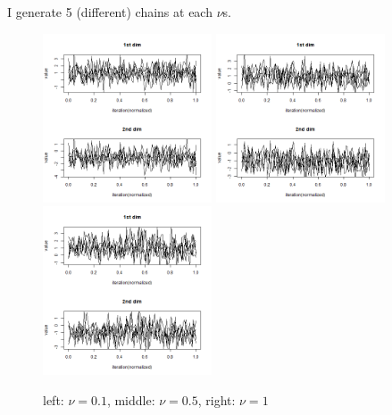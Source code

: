 \documentclass{article}
\begin{document}
I generate 5 (different) chains at each $\nu$s.
\begin{figure}[!h]
    \centering
    \includegraphics[height=5cm]{prob1_test3_many_process_traceplot.png}
    \includegraphics[height=5cm]{prob1_test2_many_process_traceplot.png}
    \includegraphics[height=5cm]{prob1_test4_many_process_traceplot.png}
    \caption{left: $\nu=0.1$, middle: $\nu=0.5$, right: $\nu=1$}
\end{figure}
\end{document}
